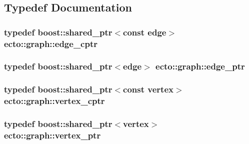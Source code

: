 \subsection{\-Typedef \-Documentation}
\hypertarget{namespaceecto_1_1graph_ac45fa43674f9071675a1ebbf4d021eb4}{
\subsubsection[{edge\-\_\-cptr}]{\setlength{\rightskip}{0pt plus 5cm}typedef boost\-::shared\-\_\-ptr$<$const {\bf edge}$>$ {\bf ecto\-::graph\-::edge\-\_\-cptr}}}\label{namespaceecto_1_1graph_ac45fa43674f9071675a1ebbf4d021eb4}
\hypertarget{namespaceecto_1_1graph_ad6da390ef18395607e6eab139f37fcf4}{
\subsubsection[{edge\-\_\-ptr}]{\setlength{\rightskip}{0pt plus 5cm}typedef boost\-::shared\-\_\-ptr$<${\bf edge}$>$ {\bf ecto\-::graph\-::edge\-\_\-ptr}}}\label{namespaceecto_1_1graph_ad6da390ef18395607e6eab139f37fcf4}
\hypertarget{namespaceecto_1_1graph_ab1ad7248e81caff384fed98d61fca8ca}{
\subsubsection[{vertex\-\_\-cptr}]{\setlength{\rightskip}{0pt plus 5cm}typedef boost\-::shared\-\_\-ptr$<$const {\bf vertex}$>$ {\bf ecto\-::graph\-::vertex\-\_\-cptr}}}\label{namespaceecto_1_1graph_ab1ad7248e81caff384fed98d61fca8ca}
\hypertarget{namespaceecto_1_1graph_a878e413dd7cdb7395b02f5be20e12b51}{
\subsubsection[{vertex\-\_\-ptr}]{\setlength{\rightskip}{0pt plus 5cm}typedef boost\-::shared\-\_\-ptr$<${\bf vertex}$>$ {\bf ecto\-::graph\-::vertex\-\_\-ptr}}}\label{namespaceecto_1_1graph_a878e413dd7cdb7395b02f5be20e12b51}
